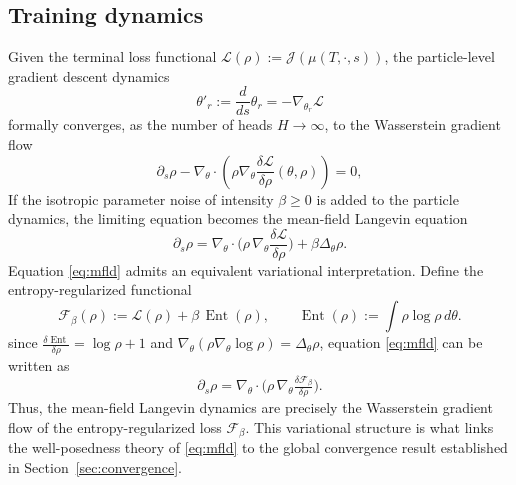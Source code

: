 \documentclass[11pt,a4wide]{article}
\theoremstyle{definition}
\DeclareMathOperator{\Ent}{Ent}
\begin{document}
\subsection{Training dynamics}
Given the terminal loss functional $\mathcal L(\rho) := \mathcal J(\mu(T,\cdot,s))$, the particle-level gradient descent dynamics  
$$
\theta'_r:=  \frac{d}{ds} \theta_r = -\nabla_{\theta_r}\mathcal L
$$
formally converges, as the number of heads  $H\to\infty$,  to the Wasserstein gradient flow
\begin{equation}
\partial_s\rho - \nabla_\theta\cdot \left(\rho  \nabla_\theta\frac{\delta\mathcal L}{\delta\rho}(\theta,\rho) \right) = 0, 
\label{eq:training-transport}
\end{equation}
If the isotropic parameter noise of intensity $\beta\ge 0$ is added to the particle dynamics,  the limiting equation becomes the mean-field Langevin equation 
\begin{equation}
\partial_s\rho = \nabla_\theta\cdot\Big(\rho\,\nabla_\theta\frac{\delta\mathcal L}{\delta\rho}\Big) + \beta\Delta_\theta\rho.
\label{eq:mfld}
\end{equation}
Equation \eqref{eq:mfld} admits an equivalent variational interpretation. Define the entropy-regularized functional
\begin{equation}
\mathcal F_\beta(\rho) := \mathcal L(\rho) + \beta\,\Ent(\rho) , \qquad \Ent(\rho):=\int \rho\log\rho\, d\theta.
\label{eq:Fbeta}
\end{equation}
since $\tfrac{\delta \Ent}{\delta \rho}=\log\rho+1$ and $\nabla_\theta(\rho \nabla_\theta \log\rho)= \Delta_\theta\rho$, equation \eqref{eq:mfld}
can be written as 
$$
\partial_s\rho = \nabla_\theta\cdot\big(\rho\,\nabla_\theta \tfrac{\delta\mathcal F_\beta}{\delta\rho}\big).
$$ 
Thus, the mean-field Langevin dynamics are precisely the Wasserstein gradient flow of the entropy-regularized loss  $ \mathcal F_\beta$. 
This variational structure  is what links the well-posedness theory of \eqref{eq:mfld} to the global convergence result established in Section~\ref{sec:convergence}.
\end{document}
